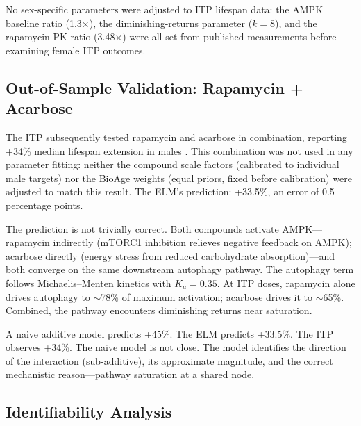 \documentclass[11pt]{article}
\begin{document}
No sex-specific parameters were adjusted to ITP lifespan data: the AMPK baseline ratio (1.3$\times$), the diminishing-returns parameter ($k = 8$), and the rapamycin PK ratio (3.48$\times$) were all set from published measurements before examining female ITP outcomes.

\subsection{Out-of-Sample Validation: Rapamycin + Acarbose}

The ITP subsequently tested rapamycin and acarbose in combination, reporting +34\% median lifespan extension in males \citep{Strong2022}. This combination was not used in any parameter fitting: neither the compound scale factors (calibrated to individual male targets) nor the BioAge weights (equal priors, fixed before calibration) were adjusted to match this result. The ELM's prediction: +33.5\%, an error of 0.5 percentage points.

The prediction is not trivially correct. Both compounds activate AMPK---rapamycin indirectly (mTORC1 inhibition relieves negative feedback on AMPK); acarbose directly (energy stress from reduced carbohydrate absorption)---and both converge on the same downstream autophagy pathway. The autophagy term follows Michaelis--Menten kinetics with $K_a = 0.35$. At ITP doses, rapamycin alone drives autophagy to $\sim$78\% of maximum activation; acarbose drives it to $\sim$65\%. Combined, the pathway encounters diminishing returns near saturation.

A naive additive model predicts +45\%. The ELM predicts +33.5\%. The ITP observes +34\%. The naive model is not close. The model identifies the direction of the interaction (sub-additive), its approximate magnitude, and the correct mechanistic reason---pathway saturation at a shared node.


\subsection{Identifiability Analysis}
\label{sec:results_identifiability}
\end{document}
